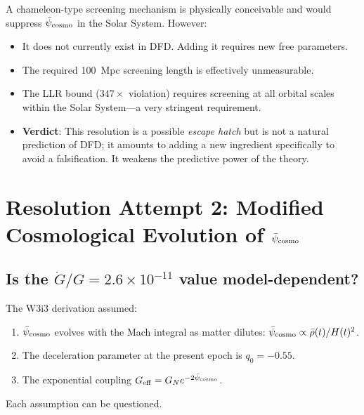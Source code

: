 \documentclass[11pt]{article}
\newcommand{\ee}[1]{\times 10^{#1}}
\newcommand{\psicosmo}{\bar{\psi}_{\rm cosmo}}
\begin{document}
\begin{tcolorbox}[colback=orange!5!white, colframe=orange!60!black,
  title=\textbf{Resolution 1 Assessment: Screening is Theoretically Possible but Not Native to DFD}]
A chameleon-type screening mechanism is physically conceivable and would
suppress $\psicosmo$ in the Solar System. However:
\begin{itemize}[nosep]
\item It does not currently exist in DFD. Adding it requires new free parameters.
\item The required 100~Mpc screening length is effectively unmeasurable.
\item The LLR bound ($347\times$ violation) requires screening at all orbital
  scales within the Solar System---a very stringent requirement.
\item \textbf{Verdict}: This resolution is a possible \emph{escape hatch} but
  is not a natural prediction of DFD; it amounts to adding a new ingredient
  specifically to avoid a falsification. It weakens the predictive power of
  the theory.
\end{itemize}
\end{tcolorbox}

\section{Resolution Attempt 2: Modified Cosmological Evolution of $\psicosmo$}
\label{sec:modified-evolution}

\subsection{Is the $\dot{G}/G = 2.6\ee{-11}$ value model-dependent?}

The W3i3 derivation assumed:
\begin{enumerate}
\item $\psicosmo$ evolves with the Mach integral as matter dilutes: $\psicosmo \propto \bar{\rho}(t)/H(t)^2$.
\item The deceleration parameter at the present epoch is $q_0 = -0.55$.
\item The exponential coupling $G_{\rm eff} = G_N e^{-2\psicosmo}$.
\end{enumerate}

Each assumption can be questioned.
\end{document}
